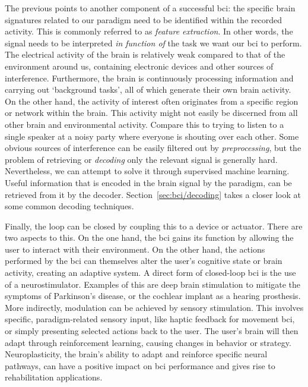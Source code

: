 The previous points to another component of a successful \ac{bci}: the specific
brain signatures related to our paradigm need to be identified within the recorded
activity.
This is commonly referred to as \emph{feature extraction}.
In other words, the signal needs to be interpreted \emph{in function of} the
task we want our \ac{bci} to perform.
The electrical activity of the brain is relatively weak compared to that of the
environment around us, containing electronic devices and other sources of
interference.
Furthermore, the brain is continuously processing information and carrying out
`background tasks', all of which generate their own brain activity.
On the other hand, the activity of interest often
originates from a specific region or network within the brain.
This activity might not easily be discerned from all other brain and
environmental activity.
Compare this to trying to listen to a single speaker at a noisy party where
everyone is shouting over each other.
Some obvious sources of interference can be easily filtered out by
\emph{preprocessing}, but the problem of retrieving or \emph{decoding} only the
relevant signal is generally hard.
Nevertheless, we can attempt to solve it through supervised machine learning.
Useful information that is encoded in the brain signal by the paradigm,
can be retrieved from it by the decoder.
Section~\ref{sec:bci/decoding} takes a closer look at some common decoding
techniques.

Finally, the loop can be closed by coupling this to a
device or actuator.
There are two aspects to this.
On the one hand, the \ac{bci} gains its function by allowing the user to interact
with their environment.
On the other hand, the actions performed by the \ac{bci} can themselves alter
the user's cognitive state or brain activity, creating an adaptive system.
A direct form of closed-loop \ac{bci} is the use of a neurostimulator.
Examples of this are deep brain stimulation to mitigate the symptoms of
Parkinson's disease, or the cochlear implant as a hearing prosthesis.
More indirectly, modulation can be achieved by sensory stimulation.
This involves specific, paradigm-related sensory input, like haptic
feedback for movement \ac{bci}, or simply presenting selected actions
back to the user.
The user's brain will then adapt through reinforcement learning, causing
changes in behavior or strategy.
Neuroplasticity, the brain's ability to adapt and reinforce specific neural
pathways, can have a positive impact on \ac{bci} performance and gives rise to
rehabilitation applications.

